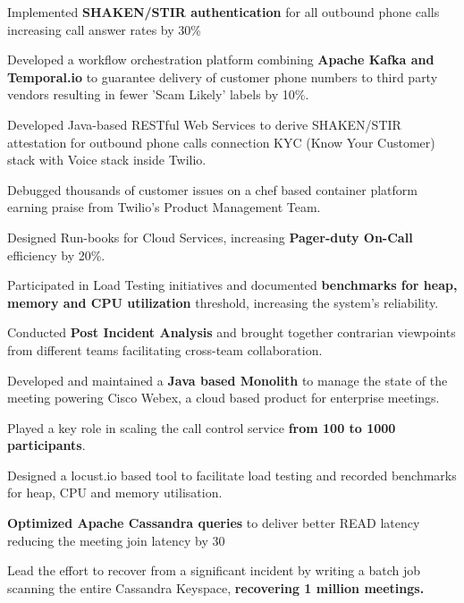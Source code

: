 \documentclass[letterpaper]{deedy-resume} %
\begin{document}
\begin{minipage}[t]{0.66\textwidth}
\vspace{\topsep} %
\begin{tightitemize}
\item Implemented \textbf{SHAKEN/STIR authentication} for all outbound phone calls increasing call answer rates by 30\%
\item Developed a workflow orchestration platform combining \textbf{Apache Kafka and Temporal.io} to guarantee delivery of customer phone numbers to third party vendors resulting in fewer 'Scam Likely' labels by 10\%. 
\item Developed Java-based RESTful Web Services to derive SHAKEN/STIR attestation for outbound phone calls connection KYC (Know Your Customer) stack with Voice stack inside Twilio. 
\item Debugged thousands of customer issues on a chef based container platform earning praise from Twilio's Product Management Team.
\item Designed Run-books for Cloud Services, increasing \textbf{Pager-duty On-Call} efficiency by 20\%.
\item Participated in Load Testing initiatives and documented \textbf{benchmarks for heap, memory and CPU utilization} threshold, increasing the system's reliability. 
\item Conducted \textbf{Post Incident Analysis} and brought together contrarian viewpoints from different teams facilitating cross-team collaboration.  
\end{tightitemize}

\sectionspace %



\begin{tightitemize}
\item Developed and maintained a \textbf{Java based Monolith} to manage the state of the meeting powering Cisco Webex, a cloud based product for enterprise meetings. 
\item Played a key role in scaling the call control service \textbf{from 100 to 1000 participants}. \item Designed a locust.io based tool to facilitate load testing and recorded benchmarks for heap, CPU and memory utilisation.
\item \textbf{Optimized Apache Cassandra queries} to deliver better READ latency reducing the meeting join latency by 30%
\item Lead the effort to recover from a significant incident by writing a batch job scanning the entire Cassandra Keyspace, \textbf{recovering 1 million meetings.}
\end{tightitemize}


\end{minipage}
\end{document}
